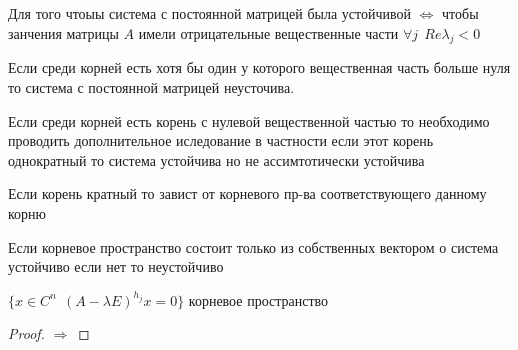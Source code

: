 \begin{block}
  Для того чтоыы система с постоянной матрицей была устойчивой
  $\Leftrightarrow$ чтобы занчения матрицы $A$ имели отрицательные вещественные
  части $\forall j ~~ Re \lambda_j < 0$
\end{block}

\begin{block}
  Если среди корней есть хотя бы один у которого вещественная часть больше нуля
  то система с постоянной матрицей неусточива.
\end{block}

Если среди корней есть корень с нулевой вещественной частью то необходимо
проводить дополнительное иследование в частности если этот корень однократный
то система устойчива но не ассимтотически устойчива

Если корень кратный то завист от корневого пр-ва соответствующего данному корню

Если корневое пространство состоит только из собственных вектором о система
устойчиво если нет то неустойчиво

$\{x \in C^n ~~ (A - \lambda E)^{h_j} x = 0 \}$ корневое пространство

\begin{proof}
  $\Rightarrow$
\end{proof}
